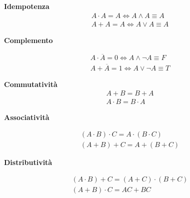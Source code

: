 \begin{thm}
	\textbf{Idempotenza}
	\begin{equation*}\begin{aligned}
		A \cdot A = A \iff A \land A \equiv A \\
		A + A = A \iff A \lor A \equiv A 
	\end{aligned}\end{equation*}
\end{thm}

\begin{thm}
	\textbf{Complemento}
	
	\begin{equation*}\begin{aligned}
		A \cdot \overbar{A} = 0 \iff A \land \lnot A \equiv F \\ 
		A + \overbar{A} = 1 \iff A \lor \lnot A \equiv T
	\end{aligned}\end{equation*}	
\end{thm}

\begin{thm}
	\textbf{Commutatività}
	\begin{equation*}\begin{aligned}
		A + B = B + A  \\
		A \cdot B = B \cdot A 
	\end{aligned}\end{equation*}
\end{thm}

\begin{thm}
	\textbf{Associatività}
	
	\begin{equation*}\begin{aligned}
		(A \cdot B) \cdot C = A \cdot (B \cdot C) \\ 
		(A + B) + C = A + (B + C) 
	\end{aligned}\end{equation*}
\end{thm}


\begin{thm}
	\textbf{Distributività}
	
	\begin{equation*}\begin{aligned}
		(A \cdot B) + C = (A+C) \cdot (B+C) \\
		(A+B) \cdot C = AC + BC
	\end{aligned}\end{equation*}
\end{thm}

